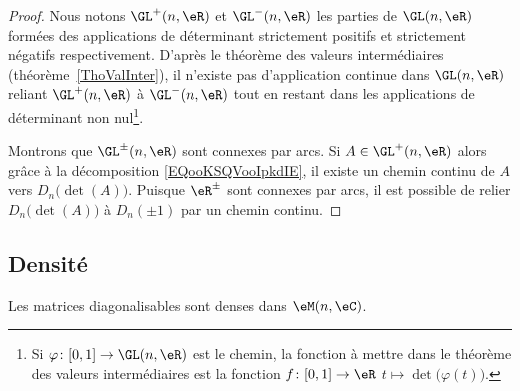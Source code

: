\begin{proof}
	Nous notons \( \GL^+(n,\eR)\) et \( \GL^-(n,\eR)\) les parties de \( \GL(n,\eR)\) formées des applications de déterminant strictement positifs et strictement négatifs respectivement. D'après le théorème des valeurs intermédiaires (théorème~\ref{ThoValInter}), il n'existe pas d'application continue dans \( \GL(n,\eR)\) reliant \( \GL^+(n,\eR)\) à \( \GL^-(n,\eR)\) tout en restant dans les applications de déterminant non nul\footnote{Si \( \varphi\colon \mathopen[ 0 , 1 \mathclose]\to \GL(n,\eR)\) est le chemin, la fonction à mettre dans le théorème des valeurs intermédiaires est la fonction \( f\colon \mathopen[ 0 , 1 \mathclose]\to \eR\) \(t\mapsto \det\big( \varphi(t) \big)\).}.

	Montrons que \( \GL^{\pm}(n,\eR)\) sont connexes par arcs. Si \( A\in\GL^+(n,\eR)\) alors grâce à la décomposition \eqref{EQooKSQVooIpkdIE}, il existe un chemin continu de \( A\) vers \( D_n\big( \det(A) \big)\). Puisque \( \eR^{\pm}\) sont connexes par arcs, il est possible de relier \( D_n\big( \det(A) \big)\) à \( D_n(\pm 1)\) par un chemin continu.
\end{proof}

\subsection{Densité}

\begin{proposition}     \label{PropDigDensVxzPuo}
	Les matrices diagonalisables sont denses dans \( \eM(n,\eC)\).
\end{proposition}

